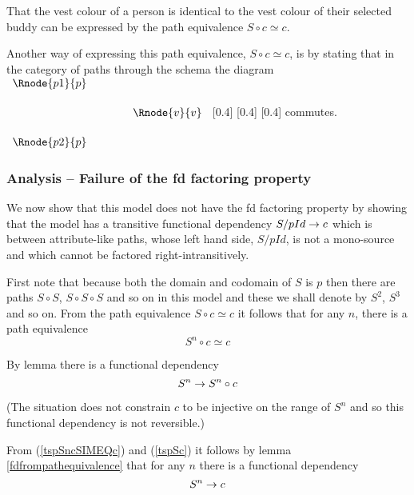That the  vest colour  of a person is 
identical to the vest colour of their selected buddy can be expressed by the path equivalence $S \circ c \simeq c$. 
\begin{categoricalaside}
Another way of expressing this 
path equivalence, $S \circ c \simeq c$, is by stating that in the category of paths through the schema  the diagram
$
\begin{array}{c p{0.75cm} c}
   \Rnode{p1}{p}  & &                  \\[0.5cm]
	                 & &    \Rnode{v}{v} \\[0.5cm]
   \Rnode{p2}{p}  & &
			
\end{array}
$
[0.4]
[0.4]
[0.4]
commutes. 
\end{categoricalaside}

\subsubsection{Analysis -- Failure of the fd factoring property}
We now show that this model does not have the fd factoring property by showing that
the model has a transitive functional dependency $S/pId \rightarrow c$ which is between
attribute-like paths, whose left hand side, $S/pId$, is not a mono-source and  which cannot be factored right-intransitively.

First note that because both the domain and  codomain of $S$ is $p$ then there are paths $S \circ S$, $S \circ S \circ S$ 
and so on in this model and these we shall denote by $S^2$, $S^3$ and so on. 
From the path equivalence $S \circ c \simeq c$ it follows that for any $n$, there is
a path equivalence 
\begin{equation}
\label{tspSncSIMEQc}
S^n \circ c \simeq c
\end{equation}

By lemma  there is a functional dependency
\begin{equation}
\label{tspSc}
S^n \rightarrow S^n \circ c
\end{equation}

(The situation does not constrain $c$ to be injective on the range of $S^n$ and so this functional dependency is not reversible.)

From (\ref{tspSncSIMEQc}) and (\ref{tspSc}) it follows by lemma \ref{fdfrompathequivalence} that for any $n$ there is a functional dependency
\begin{equation}
\label{tspSnc}
S^n \rightarrow c
\end{equation}


